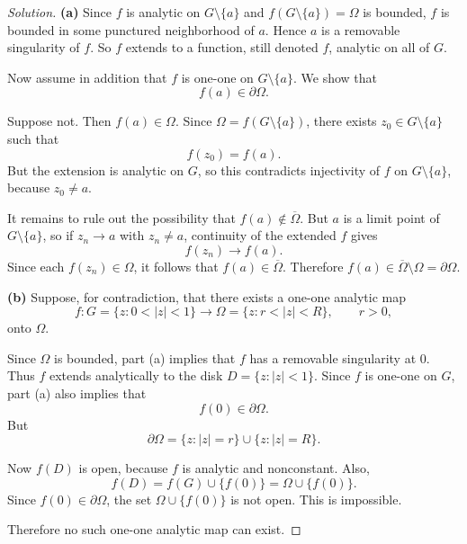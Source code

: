 \documentclass[12pt, a4paper]{report}
\theoremstyle{spaced}
\begin{document}
\begin{proof}[Solution]
	\textbf{(a)} Since \(f\) is analytic on \(G\setminus\{a\}\) and \(f(G\setminus\{a\})=\Omega\) is bounded, \(f\) is bounded in some punctured neighborhood of \(a\). Hence \(a\) is a removable singularity of \(f\). So \(f\) extends to a function, still denoted \(f\), analytic on all of \(G\).

	Now assume in addition that \(f\) is one-one on \(G\setminus\{a\}\). We show that
	\[
		f(a)\in \partial \Omega.
	\]

	Suppose not. Then \(f(a)\in \Omega\). Since \(\Omega=f(G\setminus\{a\})\), there exists \(z_0\in G\setminus\{a\}\) such that
	\[
		f(z_0)=f(a).
	\]
	But the extension is analytic on \(G\), so this contradicts injectivity of \(f\) on \(G\setminus\{a\}\), because \(z_0\neq a\).

	It remains to rule out the possibility that \(f(a)\notin \overline{\Omega}\). But \(a\) is a limit point of \(G\setminus\{a\}\), so if \(z_n\to a\) with \(z_n\neq a\), continuity of the extended \(f\) gives
	\[
		f(z_n)\to f(a).
	\]
	Since each \(f(z_n)\in \Omega\), it follows that \(f(a)\in \overline{\Omega}\). Therefore \(f(a)\in \overline{\Omega}\setminus \Omega=\partial\Omega\).

	\medskip
	\textbf{(b)} Suppose, for contradiction, that there exists a one-one analytic map
	\[
		f:G=\{z:0<|z|<1\}\to \Omega=\{z:r<|z|<R\},
		\qquad r>0,
	\]
	onto \(\Omega\).

	Since \(\Omega\) is bounded, part (a) implies that \(f\) has a removable singularity at \(0\). Thus \(f\) extends analytically to the disk \(D=\{z:|z|<1\}\). Since \(f\) is one-one on \(G\), part (a) also implies that
	\[
		f(0)\in \partial\Omega.
	\]
	But
	\[
		\partial\Omega=\{z:|z|=r\}\cup \{z:|z|=R\}.
	\]

	Now \(f(D)\) is open, because \(f\) is analytic and nonconstant. Also,
	\[
		f(D)=f(G)\cup\{f(0)\}=\Omega\cup\{f(0)\}.
	\]
	Since \(f(0)\in \partial\Omega\), the set \(\Omega\cup\{f(0)\}\) is not open. This is impossible.

	Therefore no such one-one analytic map can exist.
\end{proof}
\end{document}
